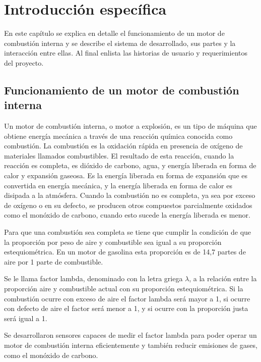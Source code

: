 \chapter{Introducción específica} %

\label{Chapter2}

En este capítulo se explica en detalle el funcionamiento de un motor de combustión interna y se describe el sistema de desarrollado, sus partes y la interacción entre ellas. Al final enlista las historias de usuario y requerimientos del proyecto.

\section{Funcionamiento de un motor de combustión interna}

Un motor de combustión interna, o motor a explosión, es un tipo de máquina que obtiene energía mecánica a través de una reacción química conocida como combustión. La combustión es la oxidación rápida en presencia de oxígeno de materiales llamados combustibles. El resultado de esta reacción, cuando la reacción es completa, es dióxido de carbono, agua, y energía liberada en forma de calor y expansión gaseosa. Es la energía liberada en forma de expansión que es convertida en energía mecánica, y la energía liberada en forma de calor es disipada a la atmósfera. Cuando la combustión no es completa, ya sea por exceso de oxígeno o en su defecto, se producen otros compuestos parcialmente oxidados como el monóxido de carbono, cuando esto sucede la energía liberada es menor.

Para que una combustión sea completa se tiene que cumplir la condición de que la proporción por peso de aire y combustible sea igual a su proporción estequiométrica. En un motor de gasolina esta proporción es de 14,7 partes de aire por 1 parte de combustible\citep{book-afr}.

Se le llama factor lambda, denominado con la letra griega $\lambda$, a la relación entre la proporción aire y combustible actual con su proporción estequiométrica. Si la combustión ocurre con exceso de aire el factor lambda será mayor a 1, si ocurre con defecto de aire el factor será menor a 1, y si ocurre con la proporción justa será igual a 1.

Se desarrollaron sensores capaces de medir el factor lambda para poder operar un motor de combustión interna eficientemente y también reducir emisiones de gases, como el monóxido de carbono.

